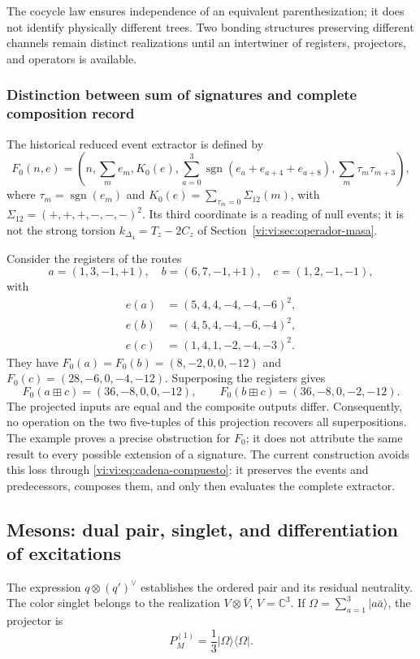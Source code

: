 The cocycle law ensures independence of an equivalent parenthesization;
it does not identify physically different trees. Two bonding structures
preserving different channels remain distinct realizations
until an intertwiner of registers, projectors, and operators is available.

\subsubsection{Distinction between sum of signatures and complete composition record}

The historical reduced event extractor is defined by
\[
 F_0(n,e)=\left(n,\sum_m e_m,K_0(e),
 \sum_{a=0}^3\operatorname{sgn}(e_a+e_{a+4}+e_{a+8}),
 \sum_m\tau_m\tau_{m+3}\right),
\]
where \(\tau_m=\operatorname{sgn}(e_m)\) and
\(K_0(e)=\sum_{\tau_m=0}\Sigma_{12}(m)\), with
\(\Sigma_{12}=(+,+,+,-,-,-)^2\). Its third coordinate is a
reading of null events; it is not the strong torsion
\(k_{\Delta_4}=T_z-2C_z\) of
Section~\ref{vi:vi:sec:operador-masa}.

Consider the registers of the routes
\[
 a=(1,3,-1,+1),\quad b=(6,7,-1,+1),\quad c=(1,2,-1,-1),
\]
with
\begin{align*}
 e(a)&=(5,4,4,-4,-4,-6)^2,\\
 e(b)&=(4,5,4,-4,-6,-4)^2,\\
 e(c)&=(1,4,1,-2,-4,-3)^2.
\end{align*}
They have \(F_0(a)=F_0(b)=(8,-2,0,0,-12)\) and
\(F_0(c)=(28,-6,0,-4,-12)\). Superposing the registers gives
\[
 F_0(a\boxplus c)=(36,-8,0,0,-12),\qquad
 F_0(b\boxplus c)=(36,-8,0,-2,-12).
\]
The projected inputs are equal and the composite outputs differ.
Consequently, no operation on the two five-tuples of this
projection recovers all superpositions. The example proves a
precise obstruction for \(F_0\); it does not attribute the same result to every
possible extension of a signature. The current construction avoids this
loss through \eqref{vi:vi:eq:cadena-compuesto}: it preserves the events
and predecessors, composes them, and only then evaluates the complete extractor.

\subsection{Mesons: dual pair, singlet, and differentiation of excitations}
\label{vi:vi:subsec:mesones-familias}

The expression \(q\otimes(q')^\vee\) establishes the ordered pair and its
residual neutrality. The color singlet belongs to the realization
\(V\otimes\overline V\), \(V=\mathbb C^3\). If
\(\Omega=\sum_{a=1}^3|a\bar a\rangle\), the projector is
\begin{equation}
 P_M^{(1)}=\frac13|\Omega\rangle\langle\Omega|.
 \label{vi:vi:eq:singlete-meson}
\end{equation}

